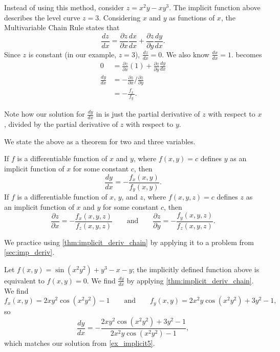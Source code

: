 Instead of using this method, consider $z=x^2y-xy^3$. The implicit function above describes the level curve $z=3$. Considering $x$ and $y$ as functions of $x$, the Multivariable Chain Rule states that
\begin{equation}\frac{dz}{dx} = \frac{\partial z}{\partial x}\frac{dx}{dx}+\frac{\partial z}{\partial y}\frac{dy}{dx}.\label{eq:mchain1}\end{equation}
Since $z$ is constant (in our example, $z=3$), $\frac{dz}{dx} = 0$. We also know $\frac{dx}{dx} = 1$.  becomes
\begin{align*}
0 &= \frac{\partial z}{\partial x}(1) + \frac{\partial z}{\partial y}\frac{dy}{dx} %
\\[5pt]
\frac{dy}{dx} &= -\frac{\partial z}{\partial x}\Big/\frac{\partial z}{\partial y}\\[5pt]
			&= -\frac{\,f_x\,}{f_y}.
\end{align*}

Note how our solution for $\frac{dy}{dx}$ in  is just the partial derivative of $z$ with respect to $x$, divided by the partial derivative of $z$ with respect to $y$.

We state the above as a theorem for two and three variables.

{If $f$ is a differentiable function of $x$ and $y$, where $f(x,y)=c$ defines $y$ as  an implicit function of $x$ for some constant $c$, then
\[\frac{dy}{dx} = - \frac{f_x(x,y)}{f_y(x,y)}.\]
If $f$ is a differentiable function of $x$, $y$, and $z$, where $f(x,y,z)=c$ defines $z$ as an implicit function of $x$ and $y$ for some constant $c$, then
\[
\frac{\partial z}{\partial x}=-\frac{f_x(x,y,z)}{f_z(x,y,z)}
\qquad\text{and}\qquad
\frac{\partial z}{\partial y}=-\frac{f_y(x,y,z)}{f_z(x,y,z)}.
\]
}

We practice using \autoref{thm:implicit_deriv_chain} by applying it to a problem from \autoref{sec:imp_deriv}.

{Let $f(x,y) = \sin(x^2y^2)+y^3-x-y$; the implicitly defined function above is equivalent to $f(x,y)=0$. We find $\frac{dy}{dx}$ by applying \autoref{thm:implicit_deriv_chain}. We find 
$$f_x(x,y) = 2xy^2\cos(x^2y^2)-1\qquad \text{and}\qquad f_y(x,y) = 2x^2y\cos(x^2y^2)+3y^2-1,$$
so 
$$\frac{dy}{dx} = -\frac{2xy^2\cos(x^2y^2)+3y^2-1}{2x^2y\cos(x^2y^2)-1},$$
which matches our solution from \autoref{ex_implicit5}.}


